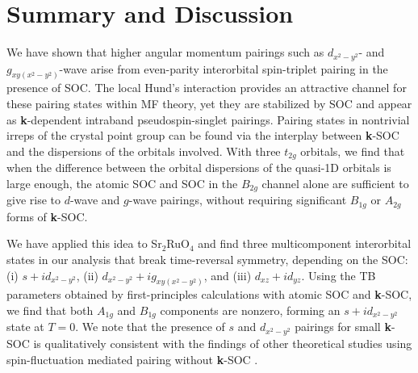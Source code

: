 \documentclass[%
reprint,
superscriptaddress,
 amsmath,amssymb,
 aps,
prb,
nobalancelastpage,
]{revtex4-2}
\begin{document}
\vspace{-3mm}
\section{\label{Five}Summary and Discussion}


We have shown that higher angular momentum pairings such as $d_{x^2-y^2}$- and $g_{xy(x^2-y^2)}$-wave arise from even-parity interorbital spin-triplet pairing in the presence of SOC. The local Hund's interaction provides an attractive channel for these pairing states within MF theory, yet they are stabilized by SOC and appear as \textbf{k}-dependent intraband pseudospin-singlet pairings. Pairing states in nontrivial irreps of the crystal point group can be found via the interplay between \textbf{k}-SOC and the dispersions of the orbitals involved. With three $t_{2g}$ orbitals, we find that when the difference between the orbital dispersions of the quasi-1D orbitals is large enough, the atomic SOC and SOC in the $B_{2g}$ channel alone are sufficient to give rise to $d$-wave and $g$-wave pairings, without requiring significant $B_{1g}$ or $A_{2g}$ forms of \textbf{k}-SOC.



We have applied this idea to Sr$_{2}$RuO$_{4}$ and find three multicomponent interorbital states in our analysis that break time-reversal symmetry, depending on the SOC: (i) $s+id_{x^2-y^2}$, (ii) $d_{x^2-y^2}+ig_{xy(x^2-y^2)}$, and (iii) $d_{xz}+id_{yz}$. Using the TB parameters obtained by first-principles calculations with atomic SOC and \textbf{k}-SOC, we find that both $A_{1g}$ and $B_{1g}$ components are nonzero, forming an $s+id_{x^2-y^2}$ state at $T=0$. We note that the presence of $s$ and $d_{x^2-y^2}$ pairings for small \textbf{k}-SOC is qualitatively consistent with the findings of other theoretical studies using spin-fluctuation mediated pairing without \textbf{k}-SOC \cite{Romer2019PRL,ZhangPRB2018}. 
\end{document}
